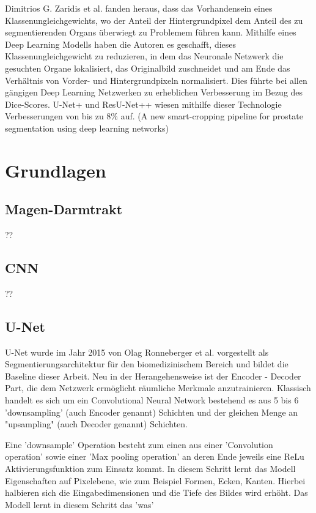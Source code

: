 Dimitrios G. Zaridis et al. fanden heraus, dass das Vorhandensein eines Klassenungleichgewichts, wo der Anteil der Hintergrundpixel dem Anteil des zu segmentierenden Organs überwiegt zu Problemem führen kann. Mithilfe eines Deep Learning Modells haben die Autoren es geschafft, dieses Klassenungleichgewicht zu reduzieren, in dem das Neuronale Netzwerk die gesuchten Organe lokalisiert, das Originalbild zuschneidet und am Ende das Verhältnis von Vorder- und Hintergrundpixeln normalisiert. Dies führte bei allen gängigen Deep Learning Netzwerken zu erheblichen Verbesserung im Bezug des Dice-Scores. U-Net+ und ResU-Net++ wiesen mithilfe dieser Technologie Verbesserungen von bis zu 8\% auf. (A new smart-cropping pipeline for prostate segmentation using deep learning networks)

\section{Grundlagen}\raggedbottom

\subsection{Magen-Darmtrakt}
?? 

\subsection{CNN}
?? 

\subsection{U-Net}

U-Net wurde im Jahr 2015 von Olag Ronneberger et al. vorgestellt als Segmentierungsarchitektur für den biomedizinischem Bereich und bildet die Baseline dieser Arbeit. Neu in der Herangehensweise ist der Encoder - Decoder Part, die dem Netzwerk ermöglicht räumliche Merkmale anzutrainieren. 
Klassisch handelt es sich um ein Convolutional Neural Network bestehend es aus 5 bis 6 'downsampling' (auch Encoder genannt) Schichten und der gleichen Menge an "upsampling" (auch Decoder genannt) Schichten. 

Eine 'downsample' Operation besteht zum einen aus einer 'Convolution operation'  sowie einer 'Max pooling operation' an deren Ende jeweils eine ReLu Aktivierungsfunktion zum Einsatz kommt. In diesem Schritt lernt das Modell Eigenschaften auf Pixelebene, wie zum Beispiel Formen, Ecken, Kanten. Hierbei halbieren sich die Eingabedimensionen und die Tiefe des Bildes wird erhöht. Das Modell lernt in diesem Schritt das 'was' 

